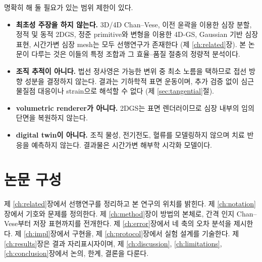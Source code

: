 명확히 해 둘 필요가 있는 범위 제한이 있다.

\begin{itemize}[leftmargin=2em]
  \item \textbf{최초성 주장을 하지 않는다.} 3D/4D Chan--Vese, 이전 윤곽을 이용한
  심장 분할, 정적 및 동적 2DGS, 정준 primitive와 변형을 이용한 4D-GS, Gaussian
  기반 심장 표현, 시간가변 심장 mesh는 모두 선행연구가 존재한다
  (제 \ref{ch:related}장). 본 논문이 다루는 것은 이들의 특정 조합과 그 효율--품질
  절충의 정량적 분석이다.
  \item \textbf{조직 추적이 아니다.} 법선 정사영은 가능한 변위 중 최소 노름을
  택하므로 접선 방향 성분을 결정하지 않는다. 결과는 기하학적 표면 운동이며,
  추가 검증 없이 심근 물질점 대응이나 strain으로 해석할 수 없다
  (제 \ref{sec:tangential}절).
  \item \textbf{volumetric renderer가 아니다.} 2DGS는 표면 렌더러이므로 심장 내부의
  임의 단면을 복원하지 않는다.
  \item \textbf{digital twin이 아니다.} 조직 물성, 전기전도, 혈류를 모델링하지
  않으며 치료 반응을 예측하지 않는다. 결과물은 시간가변 해부학 시각화 모델이다.
\end{itemize}

\section{논문 구성}

제 \ref{ch:related}장에서 선행연구를 정리하고 본 연구의 위치를 밝힌다.
제 \ref{ch:notation}장에서 기호와 문제를 정의한다. 제 \ref{ch:method}장이 방법의
본체로, 간격 인지 Chan--Vese부터 저장 표현까지를 전개한다. 제 \ref{ch:error}장에서
네 축의 오차 분석을 제시한다. 제 \ref{ch:impl}장에서 구현을, 제 \ref{ch:protocol}장에서
실험 설계를 기술한다. 제 \ref{ch:results}장은 결과 자리표시자이며,
제 \ref{ch:discussion}, \ref{ch:limitations}, \ref{ch:conclusion}장에서 논의,
한계, 결론을 다룬다.
